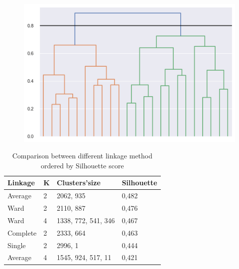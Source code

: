 \begin{figure}[h!]
\begin{minipage}{.50\textwidth}
	\end{minipage}%
	\begin{minipage}{.50\textwidth}
		\centering
		\includegraphics[width=\textwidth]{plots/hierarchical/hierarchical_dendogram_average.png}
	\end{minipage}
	\label{figure:hierarchical_dendrograms}
\end{figure}

\begin{table}[h!]
\centering
\begin{tabular}{|l|l|l|l|}
\hline
\textbf{Linkage} & \textbf{K} & \textbf{Clusters'size} & \textbf{Silhouette} \\ \hline\hline
Average          & 2          & 2062, 935              & 0,482               \\ \hline
Ward             & 2          & 2110, 887              & 0,476               \\ \hline
Ward             & 4          & 1338, 772, 541, 346    & 0,467               \\ \hline
Complete         & 2          & 2333, 664              & 0,463               \\ \hline
Single           & 2          & 2996, 1                & 0,444               \\ \hline
Average          & 4          & 1545,  924,  517, 11   & 0,421               \\ \hline
\end{tabular}
\caption{Comparison between different linkage method ordered by Silhouette score}
\label{tab:hierarchical-table}
\end{table}

